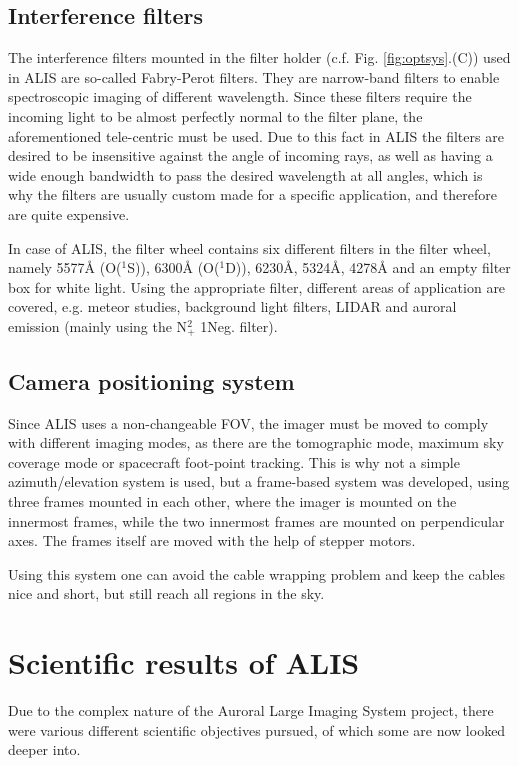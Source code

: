 \subsection{Interference filters}
\label{interference}
The interference filters mounted in the filter holder (c.f. Fig. \ref{fig:optsys}.(C)) used in ALIS are so-called Fabry-Perot filters. They are narrow-band filters to enable spectroscopic imaging of different wavelength. Since these filters require the incoming light to be almost perfectly normal to the filter plane, the aforementioned tele-centric must be used.
Due to this fact in ALIS the filters are desired to be insensitive against the angle of incoming rays, as well as having a wide enough bandwidth to pass the desired wavelength at all angles, which is why the filters are usually custom made for a specific application, and therefore are quite expensive. \par
In case of ALIS, the filter wheel contains six different filters in the filter wheel, namely 5577Å (O($^1$S)), 6300Å (O($^1$D)), 6230Å, 5324Å, 4278Å and an empty filter box for white light. Using the appropriate filter, different areas of application are covered, e.g. meteor studies, background light filters, LIDAR and auroral emission (mainly using the N$^2_+$ 1Neg. filter)\citep{brandstrom2003auroral}.

\subsection{Camera positioning system}
Since ALIS uses a non-changeable FOV, the imager must be moved to comply with different imaging modes, as there are the tomographic mode, maximum sky coverage mode or spacecraft foot-point tracking. This is why not a simple azimuth/elevation system is used, but a frame-based system was developed, using three frames mounted in each other, where the imager is mounted on the innermost frames, while the two innermost frames are mounted on perpendicular axes. The frames itself are moved with the help of stepper motors.

Using this system one can avoid the cable wrapping problem and keep the cables nice and short, but still reach all regions in the sky.



\section{Scientific results of ALIS}
Due to the complex nature of the Auroral Large Imaging System project, there were various different scientific objectives pursued, of which some are now looked deeper into. 

